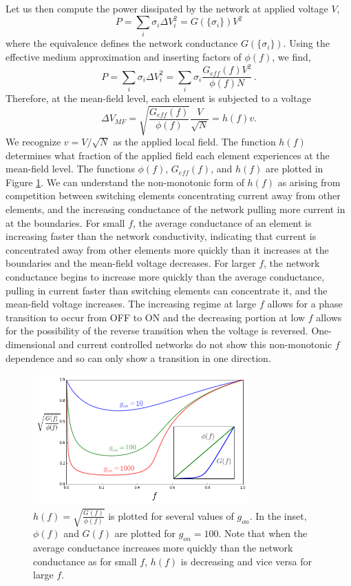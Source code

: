 \documentclass[aps,prl,reprint,groupedaddress]{revtex4-1}
\begin{document}
Let us then compute the power dissipated by the network at applied
voltage $V$,
\begin{equation}
P = \sum_i \sigma_i \Delta V_i^2 = G(\{\sigma_i\}) V^2
\end{equation}
where the equivalence defines the network conductance $G(\{\sigma_i\})$.
Using the effective medium approximation and inserting factors of $\phi(f)$,
we find,
\begin{equation}
P = \sum_i \sigma_i \Delta V_i^2 = \sum_i \sigma_i \frac{G_{eff}(f)V^2}
{\phi(f) N}\,.
\end{equation}
Therefore, at the mean-field level, each element is subjected to a voltage
\begin{equation}
\Delta V_{MF} = \sqrt{\frac{G_{eff}(f)}{\phi(f)}}\frac{V}{\sqrt{N}}
= h(f) v.
\end{equation}
We recognize $v=V/\sqrt{N}$ as the applied local field.  The function
$h(f)$ determines what fraction of the applied field each element
experiences at the mean-field level.  The functions $\phi(f)$, $G_{eff}(f)$,
and $h(f)$ are plotted in Figure \ref{MF_voltage_fig}. We can understand the non-monotonic
form of $h(f)$ as arising from competition between switching elements
concentrating current away from other elements, and the increasing conductance
of the network pulling more current in at the boundaries.  For small $f$, the
average conductance of an element is increasing faster than the network
conductivity, indicating that current is concentrated away from other elements
more quickly than it increases at the boundaries and the mean-field voltage
decreases.  For larger $f$, the network conductance begins to increase more
quickly than the average conductance, pulling in current faster than switching
elements can concentrate it, and the mean-field voltage increases.  The
increasing regime at large $f$ allows for a phase transition to occur from
OFF to ON and the decreasing portion at low $f$ allows for the possibility
of the reverse transition when the voltage is reversed.  One-dimensional and
current controlled networks do not show this non-monotonic $f$ dependence and
so can only show a transition in one direction.

\begin{figure}
\includegraphics[width=8.3cm]{MF_voltage.png}
\caption{$h(f) = \sqrt{\frac{G(f)}{\phi(f)}}$ is plotted for several values of
$g_{on}$.  In the inset, $\phi(f)$ and $G(f)$ are plotted for $g_{on}=100$.
Note that when the average conductance increases more quickly than the network
conductance as for small $f$, $h(f)$ is decreasing and vice versa
for large $f$.\label{MF_voltage_fig}}
\end{figure}
\end{document}
